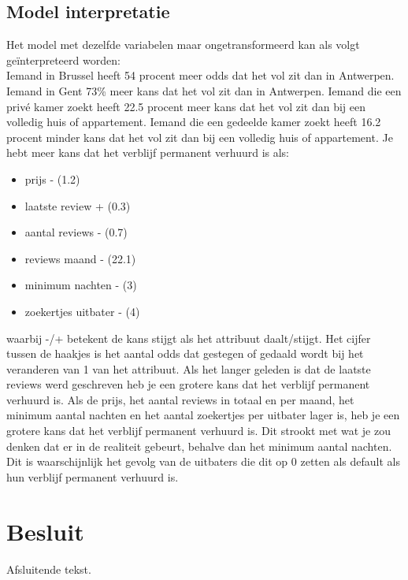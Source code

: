 \documentclass[a4paper,kulak]{kulakarticle} %
\begin{document}
\subsection{Model interpretatie}
Het model met dezelfde variabelen maar ongetransformeerd kan als volgt geïnterpreteerd worden:\\
Iemand in Brussel heeft 54 procent meer odds dat het vol zit dan in Antwerpen. Iemand in Gent   73\% meer kans dat het vol zit dan in Antwerpen.
Iemand die een privé kamer zoekt heeft 22.5 procent meer kans dat het vol zit dan bij een volledig huis of appartement.
Iemand die een gedeelde kamer zoekt   heeft 16.2 procent minder kans dat het vol zit dan bij een  volledig huis of appartement.
Je hebt meer kans dat het verblijf permanent verhuurd is als:
\begin{itemize}
	\item prijs -     (1.2)
	\item laatste review  + (0.3)
	\item aantal reviews - (0.7)
	\item reviews maand - (22.1)
	\item minimum nachten - (3)
	\item zoekertjes uitbater - (4)
\end{itemize}
waarbij -/+ betekent de kans stijgt als het attribuut daalt/stijgt.
Het cijfer tussen de haakjes is het aantal odds dat gestegen of gedaald wordt bij het veranderen van 1 van het attribuut.
Als het langer geleden is dat de laatste reviews werd geschreven heb je een grotere kans dat het verblijf permanent verhuurd is.
Als de prijs, het aantal reviews in totaal en per maand, het minimum aantal nachten en het aantal zoekertjes per uitbater lager is, heb je een grotere kans dat het verblijf permanent verhuurd is.
Dit strookt met wat je zou denken dat er in de realiteit gebeurt, behalve dan het minimum aantal nachten.
Dit is waarschijnlijk het gevolg van de uitbaters die dit op 0 zetten als default als hun verblijf permanent verhuurd is.
\section*{Besluit}

Afsluitende tekst.
\end{document}
